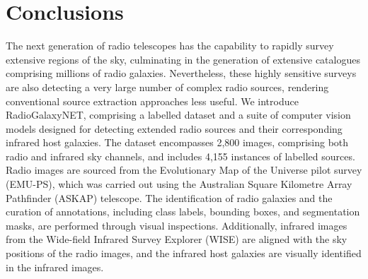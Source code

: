 \documentclass[
  journal=pasa,
  manuscript=research-paper, %
  year=2020,
  volume=37,
]{cup-journal}
\begin{document}
\section{Conclusions}
\label{SEC:Conclusions}
The next generation of radio telescopes has the capability to rapidly survey extensive regions of the sky, culminating in the generation of extensive catalogues comprising millions of radio galaxies.
Nevertheless, these highly sensitive surveys are also detecting a very large number of complex radio sources, rendering conventional source extraction approaches less useful.
We introduce RadioGalaxyNET, comprising a labelled dataset and a suite of computer vision models designed for detecting extended radio sources and their corresponding infrared host galaxies. 
The dataset encompasses 2,800 images, comprising both radio and infrared sky channels, and includes 4,155 instances of labelled sources. 
Radio images are sourced from the Evolutionary Map of the Universe pilot survey (EMU-PS), which was carried out using the Australian Square Kilometre Array Pathfinder (ASKAP) telescope. 
The identification of radio galaxies and the curation of annotations, including class labels, bounding boxes, and segmentation masks, are performed through visual inspections. 
Additionally, infrared images from the Wide-field Infrared Survey Explorer (WISE) are aligned with the sky positions of the radio images, and the infrared host galaxies are visually identified in the infrared images.
\end{document}
